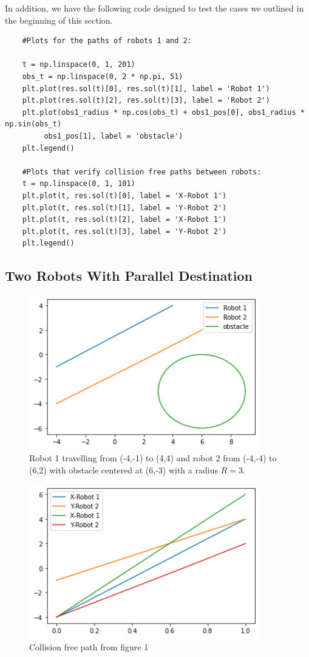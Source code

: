 In addition, we have the following code designed to test the cases we outlined in the beginning of this section.

\begin{lstlisting}
    #Plots for the paths of robots 1 and 2:

    t = np.linspace(0, 1, 201)
    obs_t = np.linspace(0, 2 * np.pi, 51)
    plt.plot(res.sol(t)[0], res.sol(t)[1], label = 'Robot 1')
    plt.plot(res.sol(t)[2], res.sol(t)[3], label = 'Robot 2')
    plt.plot(obs1_radius * np.cos(obs_t) + obs1_pos[0], obs1_radius * np.sin(obs_t)
         obs1_pos[1], label = 'obstacle')
    plt.legend()

    #Plots that verify collision free paths between robots:
    t = np.linspace(0, 1, 101)
    plt.plot(t, res.sol(t)[0], label = 'X-Robot 1')
    plt.plot(t, res.sol(t)[1], label = 'Y-Robot 2')
    plt.plot(t, res.sol(t)[2], label = 'X-Robot 1')
    plt.plot(t, res.sol(t)[3], label = 'Y-Robot 2')
    plt.legend()
\end{lstlisting}

\subsection{Two Robots With Parallel Destination}


\begin{figure}[H]
    \centering
    \includegraphics[width=10cm]{Graphs/Plot 1 parallel.png}
    \caption{Robot 1 travelling from (-4,-1) to (4,4) and robot 2 from (-4,-4) to (6,2) with obstacle centered at (6,-3) with a radius \( R = 3 \).}
    \label{fig:my_label}
\end{figure}

\begin{figure}[H]
    \centering
    \includegraphics[width=10cm]{Graphs/Collsion free path for plot 1.png}
    \caption{Collision free path from figure 1}
    \label{fig:my_label}
\end{figure}

